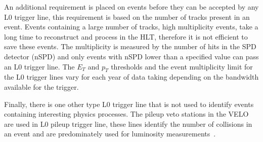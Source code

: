 An additional requirement is placed on events before they can be accepted by any L0 trigger line, this requirement is based on the number of tracks present in an event.
Events containing a large number of tracks, high multiplicity events, take a long time to reconstruct and process in the HLT, therefore it is not efficient to save these events.
The multiplicity is measured by the number of hits in the SPD detector (nSPD) and only events with nSPD lower than a specified value can pass an L0 trigger line.
The $E_{T}$ and $p_{T}$ thresholds and the event multiplicity limit for the L0 trigger lines vary for each year of data taking depending on the bandwidth available for the trigger. %

Finally, there is one other type L0 trigger line that is not used to identify events containing interesting physics processes. The pileup veto stations in the VELO are used in L0 pileup trigger line, these lines identify the number of collisions in an event and are predominately used for luminosity measurements~\cite{Aaij:2011er}.

